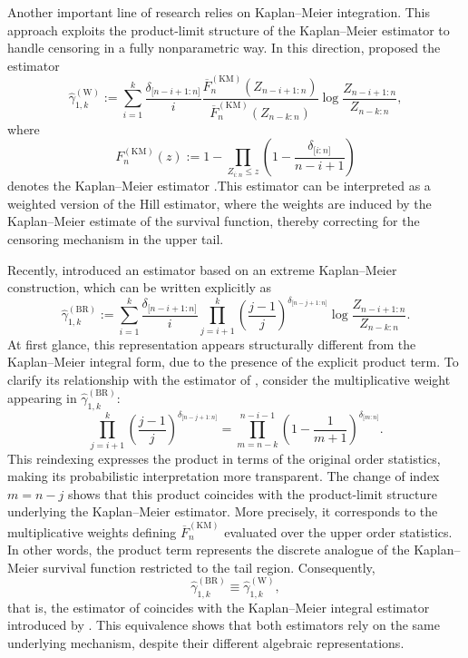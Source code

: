 \documentclass[reqno,openbib,runningheads,a4paper,12pt]{amsart}%
\begin{document}
\noindent Another important line of research relies on Kaplan--Meier
integration. This approach exploits the product-limit structure of the
Kaplan--Meier estimator to handle censoring in a fully nonparametric way. In
this direction, \cite{WW2014} proposed the estimator
\[
\widehat{\gamma}_{1,k}^{(\mathrm{W})}:=\sum_{i=1}^{k}\frac{\delta_{\lbrack
n-i+1:n]}}{i}\frac{\overline{F}_{n}^{(\mathrm{KM})}(Z_{n-i+1:n})}{\overline
{F}_{n}^{(\mathrm{KM})}(Z_{n-k:n})}\log\frac{Z_{n-i+1:n}}{Z_{n-k:n}},
\]
where
\[
F_{n}^{(\mathrm{KM})}(z):=1-\prod_{Z_{i:n}\leq z}\left(  1-\frac
{\delta_{\lbrack i:n]}}{n-i+1}\right)
\]
denotes the Kaplan--Meier estimator \citep{KM58}.This estimator can be
interpreted as a weighted version of the Hill estimator, where the weights are
induced by the Kaplan--Meier estimate of the survival function, thereby
correcting for the censoring mechanism in the upper tail.\smallskip

\noindent Recently, \cite{BR2025} introduced an estimator based on an extreme
Kaplan--Meier construction, which can be written explicitly as
\[
\widehat{\gamma}_{1,k}^{(\mathrm{BR})}:=\sum_{i=1}^{k}\frac{\delta_{\lbrack
n-i+1:n]}}{i}\prod_{j=i+1}^{k}\left(  \frac{j-1}{j}\right)  ^{\delta_{\lbrack
n-j+1:n]}}\log\frac{Z_{n-i+1:n}}{Z_{n-k:n}}.
\]
At first glance, this representation appears structurally different from the
Kaplan--Meier integral form, due to the presence of the explicit product term.
To clarify its relationship with the estimator of \cite{WW2014}, consider the
multiplicative weight appearing in $\widehat{\gamma}_{1,k}^{(\mathrm{BR})}$:
\[
\prod_{j=i+1}^{k}\left(  \frac{j-1}{j}\right)  ^{\delta_{\lbrack n-j+1:n]}%
}=\prod_{m=n-k}^{n-i-1}\left(  1-\frac{1}{m+1}\right)  ^{\delta_{\lbrack
m:n]}}.
\]
This reindexing expresses the product in terms of the original order
statistics, making its probabilistic interpretation more transparent. The
change of index $m=n-j$ shows that this product coincides with the
product-limit structure underlying the Kaplan--Meier estimator. More
precisely, it corresponds to the multiplicative weights defining $\overline
{F}_{n}^{(\mathrm{KM})}$ evaluated over the upper order statistics. In other
words, the product term represents the discrete analogue of the Kaplan--Meier
survival function restricted to the tail region. Consequently,
\[
\widehat{\gamma}_{1,k}^{(\mathrm{BR})}\equiv\widehat{\gamma}_{1,k}%
^{(\mathrm{W})},
\]
that is, the estimator of \cite{BR2025} coincides with the Kaplan--Meier
integral estimator introduced by \cite{WW2014}. This equivalence shows that
both estimators rely on the same underlying mechanism, despite their different
algebraic representations.\smallskip
\end{document}

